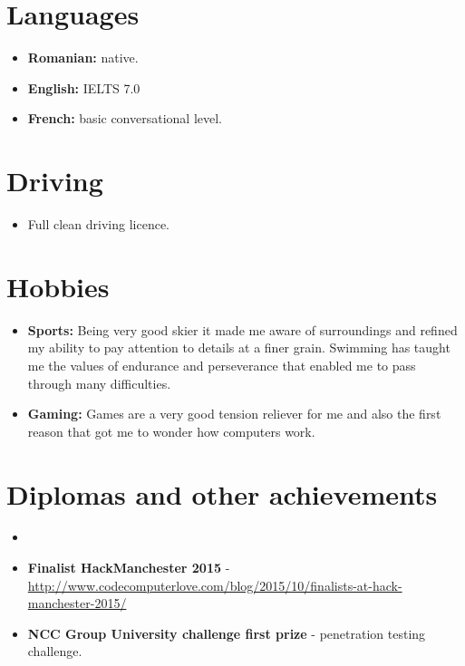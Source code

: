 \documentclass[12pt,a4paper]{res}
\begin{document}
\begin{resume}
\section{Languages}
\vspace{-0.7mm}
\begin{itemize}
\item[] {\bf Romanian:} native.
\item[] {\bf English:} IELTS 7.0
\item[] {\bf French:} basic conversational level.
\end{itemize}
\vspace{-3mm}

\section{Driving}
\vspace{-0.8mm}
\begin{itemize}
\item[] Full clean driving licence.
\end{itemize}
  \vspace{-3mm}
  
\section{Hobbies}
\vspace{-1mm}
  \begin{itemize}
  \item[] {\bf Sports:} Being very good skier it made me aware of surroundings and refined my ability to pay attention to details at a finer grain. Swimming has taught me the values of endurance and perseverance that enabled me to pass through many difficulties.
  \item[] {\bf Gaming:} Games are a very good tension reliever for me and also
  the first reason that got me to wonder how computers work.
  \end{itemize}

\section{\large\bf Diplomas and other achievements}
\vspace{0.001in}
  \begin{itemize}
  \item[]
  \item[] {\bf Finalist HackManchester 2015} - \url{http://www.codecomputerlove.com/blog/2015/10/finalists-at-hack-manchester-2015/}
  \item {\bf NCC Group University challenge first prize} - penetration testing challenge.
  \end{itemize}
\end{resume}
\end{document}
